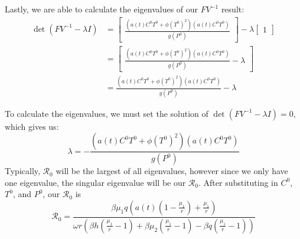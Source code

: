 \documentclass[12pt]{article}
\begin{document}
        Lastly, we are able to calculate the eigenvalues of our $FV^{-1}$ result:
        \begin{align*}
            \det(FV^{-1} - \lambda I) &= \begin{bmatrix}
                                            \frac{(a(t)C^{0}T^{0}+\phi (T^{0})^{2})(a(t)C^{0}T^{0})}{g(P^{0})}
                                        \end{bmatrix}
                                        - \lambda
                                        \begin{bmatrix}
                                            1 
                                        \end{bmatrix}
                                    \\
                                    &= \begin{bmatrix}
                                            \frac{(a(t)C^{0}T^{0}+\phi (T^{0})^{2})(a(t)C^{0}T^{0})}{g(P^{0})} - \lambda 
                                        \end{bmatrix}
                                    \\
                                    &= \frac{(a(t)C^{0}T^{0}+\phi (T^{0})^{2})(a(t)C^{0}T^{0})}{g(P^{0})} - \lambda
        \end{align*}
        
        To calculate the eigenvalues, we must set the solution of $\det(FV^{-1} - \lambda I) = 0$, which gives us:
        \begin{equation*}
            \lambda = -\frac{(a(t)C^{0}T^{0}+\phi (T^{0})^{2})(a(t)C^{0}T^{0})}{g(P^{0})}
        \end{equation*}
        Typically, $\mathscr{R}_{0}$ will be the largest of all eigenvalues, however since we only have one eigenvalue, the singular eigenvalue will be our $\mathscr{R}_{0}$. After substituting in $C^{0}$, $T^{0}$, and $P^{0}$, our $\mathscr{R}_{0}$ is
        \begin{equation*}
            \displaystyle {\mathscr{R}}_{0} = \frac{\beta \mu_{1}q(a(t)(1 - \frac{\mu_{1}}{r}) + \frac{\mu_{1}}{r})}{\omega r (\beta h (\frac{\mu_{1}}{r}-1) + \beta \mu_{2} (\frac{\mu_{1}}{r}-1) - \beta q(\frac{\mu_{1}}{r}-1))}
        \end{equation*}


    
\end{document}
